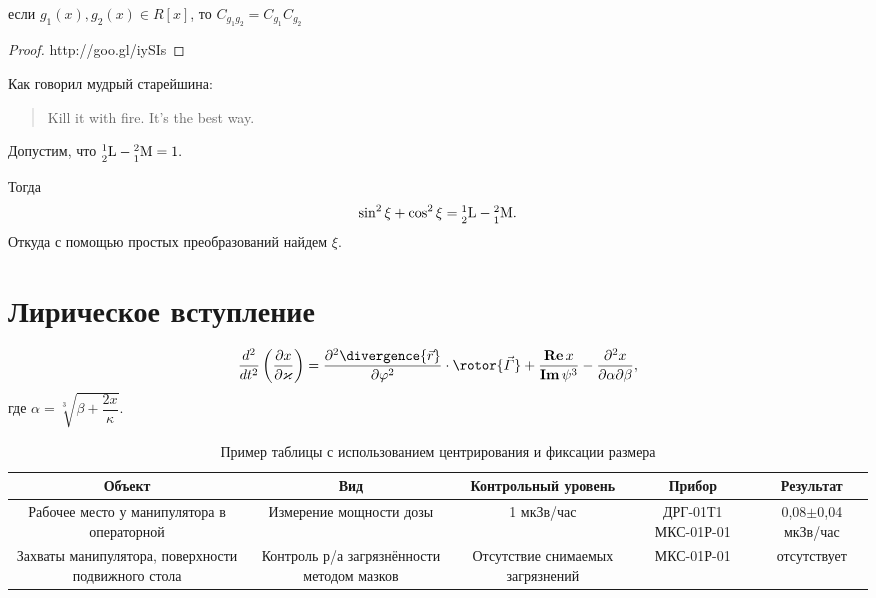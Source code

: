 \documentclass[pscyr,titlepage]{hedreport}
\begin{document}
	\begin{lemma}
		если \( g_1(x), g_2(x) \in R[x] \),
		то \( C_{g_1g_2} = C_{g_1} C_{g_2} \)
	\end{lemma}
	
	\begin{proof}
		http://goo.gl/iySIs
	\end{proof}
	
	Как говорил мудрый старейшина:
	\begin{quotation}
		Kill it with fire. It's the best way.
	\end{quotation}
	
	\begin{solution}
		Допустим, что \( \nucleus{1}{2}{L} - \nucleus{2}{1}{M} = 1. \)
		
		Тогда
		\[
			\sin^2\xi + \cos^2\xi = 
			\nucleus{1}{2}{L} - \nucleus{2}{1}{M}.
		\]		
		Откуда с помощью простых преобразований найдем \( \xi \).
	\end{solution}
	
	\section{Лирическое вступление}
	\[
		\dder{}{t}\left( \pder{x}{\kappa} \right) =
			\ppder{\divergence{\vec{r}}}{\phi}\cdot\rotor{\vec\Gamma} +
			\frac{\Re{x}}{\Im{\psi^3}} - \pcder{x}{\alpha}{\beta},
	\]
	где \( \alpha = \sqrt[3]{\beta + \dfrac{2x}{\kappa}} \).
	\begin{comment}
		При использовании пакета опции {\tt root} пакета {\tt{hedmaths}} у корня
		появится закрывающая черта:
		\[
			\Delta\sigma = \sqrt{\left( \pder{\sigma}{J}\Delta J \right)^2 +
			\left( \pder{\sigma}{U}\Delta U \right)^2 +
			\left( \pder{\sigma}{T}\Delta T \right)^2 +
			\left( \pder{\sigma}{T_0}\Delta T_0 \right)^2}.
		\]
	\end{comment}
	\begin{table}[ht]
		\centering
		\caption{Пример таблицы с использованием центрирования
			и фиксации размера}
		\begin{tabular}{|C{.2}|C{.2}|C{.17}|C{.18}|C{.15}|}
			\hline
			Объект & Вид & Контрольный уровень & Прибор & Результат \\ \hline
			Рабочее место у манипулятора в операторной
			& Измерение мощности дозы
			& 1 мкЗв/час & ДРГ-01Т1 МКС-01Р-01
			& 0,08\( \pm \)0,04 мкЗв/час \\ \hline
			Захваты манипулятора, поверхности подвижного стола
			& Контроль р/а загрязнённости методом мазков
			& Отсутствие снимаемых загрязнений
			& МКС-01Р-01 & отсутствует \\ \hline
		\end{tabular}
	\end{table}
\end{document}
